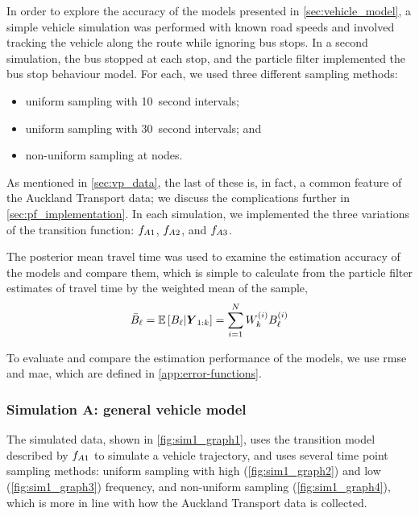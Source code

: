 In order to explore the accuracy of the models presented in \cref{sec:vehicle_model}, a simple vehicle simulation was performed with known road speeds and involved tracking the vehicle along the route while ignoring bus stops. In a second simulation, the bus stopped at each stop, and the particle filter implemented the bus stop behaviour model. For each, we used three different sampling methods:
\begin{itemize}
\item uniform sampling with 10~second intervals;
\item uniform sampling with 30~second intervals; and
\item non-uniform sampling at nodes.
\end{itemize}
As mentioned in \cref{sec:vp_data}, the last of these is, in fact, a common feature of the Auckland Transport data; we discuss the complications further in \cref{sec:pf_implementation}. In each simulation, we implemented the three variations of the transition function: $f_{A1}$, $f_{A2}$, and $f_{A3}$.



The posterior mean travel time was used
to examine the estimation accuracy of the models and compare them,
which is simple to calculate from the particle filter estimates of travel time by
the weighted mean of the sample,
\begin{equation}
\label{eq:pf_travel_time_mean}
\bar{B}_\ell =
\mathbb{E}\left[B_\ell | \boldsymbol{Y}_{1:k}\right] =
\sum_{i=1}^N W^{(i)}_k B^{(i)}_\ell
\end{equation}


To evaluate and compare the estimation performance of the models, we use \gls{rmse} and \gls{mae}, which are defined in \cref{app:error-functions}.


\subsubsection{Simulation A: general vehicle model}
\label{sec:vehicle_sim_A}





The simulated data, shown in \cref{fig:sim1_graph1}, uses the transition model described by $f_{A1}$ to simulate a vehicle trajectory, and uses several time point sampling methods: uniform sampling with high (\cref{fig:sim1_graph2}) and low (\cref{fig:sim1_graph3}) frequency, and non-uniform sampling (\cref{fig:sim1_graph4}), which is more in line with how the Auckland Transport data is collected.


